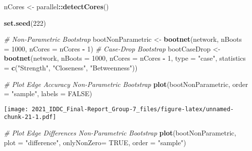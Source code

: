 \documentclass[
]{article}
\newenvironment{Shaded}{\begin{snugshade}}{\end{snugshade}}
\newcommand{\CommentTok}[1]{\textcolor[rgb]{0.56,0.35,0.01}{\textit{#1}}}
\newcommand{\DataTypeTok}[1]{\textcolor[rgb]{0.13,0.29,0.53}{#1}}
\newcommand{\DecValTok}[1]{\textcolor[rgb]{0.00,0.00,0.81}{#1}}
\newcommand{\KeywordTok}[1]{\textcolor[rgb]{0.13,0.29,0.53}{\textbf{#1}}}
\newcommand{\NormalTok}[1]{#1}
\newcommand{\OperatorTok}[1]{\textcolor[rgb]{0.81,0.36,0.00}{\textbf{#1}}}
\newcommand{\OtherTok}[1]{\textcolor[rgb]{0.56,0.35,0.01}{#1}}
\newcommand{\StringTok}[1]{\textcolor[rgb]{0.31,0.60,0.02}{#1}}
\begin{document}
\begin{Shaded}
\begin{Highlighting}[]
\NormalTok{nCores <-}\StringTok{ }\NormalTok{parallel}\OperatorTok{::}\KeywordTok{detectCores}\NormalTok{()}

\KeywordTok{set.seed}\NormalTok{(}\DecValTok{222}\NormalTok{)}

\CommentTok{# Non-Parametric Bootstrap}
\NormalTok{bootNonParametric <-}\StringTok{ }\KeywordTok{bootnet}\NormalTok{(network,}
                             \DataTypeTok{nBoots =} \DecValTok{1000}\NormalTok{,}
                             \DataTypeTok{nCores =}\NormalTok{ nCores }\OperatorTok{-}\StringTok{ }\DecValTok{1}\NormalTok{)}
\CommentTok{# Case-Drop Bootstrap}
\NormalTok{bootCaseDrop <-}\StringTok{ }\KeywordTok{bootnet}\NormalTok{(network,}
                        \DataTypeTok{nBoots =} \DecValTok{1000}\NormalTok{,}
                        \DataTypeTok{nCores =}\NormalTok{ nCores }\OperatorTok{-}\StringTok{ }\DecValTok{1}\NormalTok{,}
                        \DataTypeTok{type =} \StringTok{"case"}\NormalTok{,}
                        \DataTypeTok{statistics =} \KeywordTok{c}\NormalTok{(}\StringTok{"Strength"}\NormalTok{, }\StringTok{"Closeness"}\NormalTok{, }\StringTok{"Betweenness"}\NormalTok{))}
\end{Highlighting}
\end{Shaded}

\begin{Shaded}
\begin{Highlighting}[]
\CommentTok{# Plot Edge Accuracy Non-Parametric Bootstrap}
\KeywordTok{plot}\NormalTok{(bootNonParametric,}
     \DataTypeTok{order =} \StringTok{"sample"}\NormalTok{,}
     \DataTypeTok{labels =} \OtherTok{FALSE}\NormalTok{)}
\end{Highlighting}
\end{Shaded}

\texttt{[image: 2021\_IDDC\_Final-Report\_Group-7\_files/figure-latex/unnamed-chunk-21-1.pdf]}

\begin{Shaded}
\begin{Highlighting}[]
\CommentTok{# Plot Edge Differences Non-Parametric Bootstrap}
\KeywordTok{plot}\NormalTok{(bootNonParametric,}
     \DataTypeTok{plot =} \StringTok{"difference"}\NormalTok{,}
     \DataTypeTok{onlyNonZero=} \OtherTok{TRUE}\NormalTok{,}
     \DataTypeTok{order =} \StringTok{"sample"}\NormalTok{)}
\end{Highlighting}
\end{Shaded}
\end{document}
